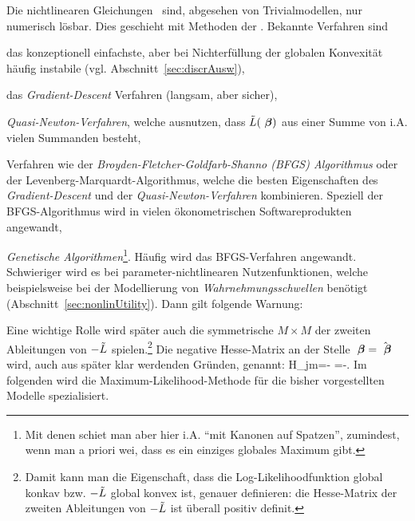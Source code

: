  Die nichtlinearen Gleichungen~ sind, abgesehen von
Trivialmodellen, nur numerisch l\"osbar. Dies geschieht mit
Methoden der . Bekannte Verfahren
sind
\bi
\item das konzeptionell einfachste, aber bei Nichterf\"ullung der
  globalen Konvexit\"at
h\"aufig instabile 
(vgl. Abschnitt~\ref{sec:discrAusw}),
\item das \emph{Gradient-Descent} Verfahren
(langsam, aber sicher),
\item \emph{Quasi-Newton-Verfahren}, welche ausnutzen, dass $\tilde{L}({\mbox{ \boldmath {$\beta$}}})$
  aus einer Summe von i.A. vielen Summanden besteht,
\item Verfahren wie der \emph{Broyden-Fletcher-Goldfarb-Shanno (BFGS)
  Algorithmus} oder der {Levenberg-Marquardt-Algorithmus}, welche die
  besten Eigenschaften des \emph{Gra\-di\-ent-Descent} und der
  \emph{Quasi-Newton-Verfahren} kombinieren. Speziell der
  BFGS-Algo\-rith\-mus wird in vielen \"okonometrischen Softwareprodukten 
  angewandt,
  \item \emph{Genetische Algorithmen}\footnote{Mit denen schie\3t man
    aber hier i.A. ``mit Kanonen auf Spatzen'', zumindest, wenn man a
    priori wei\3, dass es ein einziges globales Maximum gibt.}.
\ei
%
H\"aufig wird das BFGS-Verfahren angewandt.  Schwieriger wird es bei
parameter-nichtlinearen Nutzenfunktionen, welche beispielsweise bei der
Modellierung von \emph{Wahr\-neh\-mungs\-schwel\-len} ben\"otigt
(Abschnitt~\ref{sec:nonlinUtility}). Dann gilt folgende Warnung:


Eine wichtige Rolle wird sp\"ater auch die symmetrische $M\times M$
 der zweiten 
Ableitungen von $-\tilde{L}$ spielen.\footnote{Damit kann man die Eigenschaft, dass die
  Log-Likelihoodfunktion global konkav bzw. $-\tilde{L}$ global konvex
  ist, genauer definieren: die Hesse-Matrix der zweiten Ableitungen
  von $-\tilde{L}$ ist \"uberall
positiv definit.}  Die negative Hesse-Matrix an der Stelle ${\mbox{ \boldmath {$\beta$}}}=\hat{{\mbox{ \boldmath {$\beta$}}}}$
wird, auch aus sp\"ater klar werdenden Gr\"unden,
 genannt:
\be
\label{HesseL}
H_{jm}=-
\quad {} \quad
{}=-\ablpartmix{\tilL(\hatvecbeta)}{\vecbeta}{\vecbeta\tr}.
\ee
%
Im folgenden wird die Maximum-Likelihood-Methode f\"ur
die bisher vorgestellten Modelle spezialisiert.


